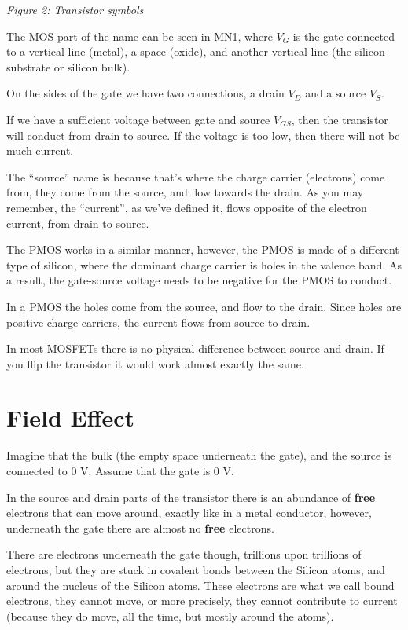 {
\centering
{}
}

\emph{Figure 2: Transistor symbols}

The MOS part of the name can be seen in MN1, where \(V_{G}\) is the gate
connected to a vertical line (metal), a space (oxide), and another
vertical line (the silicon substrate or silicon bulk).

On the sides of the gate we have two connections, a drain \(V_{D}\) and
a source \(V_{S}\).

If we have a sufficient voltage between gate and source \(V_{GS}\), then
the transistor will conduct from drain to source. If the voltage is too
low, then there will not be much current.

The ``source'' name is because that's where the charge carrier
(electrons) come from, they come from the source, and flow towards the
drain. As you may remember, the ``current'', as we've defined it, flows
opposite of the electron current, from drain to source.

The PMOS works in a similar manner, however, the PMOS is made of a
different type of silicon, where the dominant charge carrier is holes in
the valence band. As a result, the gate-source voltage needs to be
negative for the PMOS to conduct.

In a PMOS the holes come from the source, and flow to the drain. Since
holes are positive charge carriers, the current flows from source to
drain.

In most MOSFETs there is no physical difference between source and
drain. If you flip the transistor it would work almost exactly the same.

\section{Field Effect}\label{field-effect}

Imagine that the bulk (the empty space underneath the gate), and the
source is connected to 0 V. Assume that the gate is 0 V.

In the source and drain parts of the transistor there is an abundance of
\textbf{free} electrons that can move around, exactly like in a metal
conductor, however, underneath the gate there are almost no
\textbf{free} electrons.

There are electrons underneath the gate though, trillions upon trillions
of electrons, but they are stuck in covalent bonds between the Silicon
atoms, and around the nucleus of the Silicon atoms. These electrons are
what we call bound electrons, they cannot move, or more precisely, they
cannot contribute to current (because they do move, all the time, but
mostly around the atoms).

